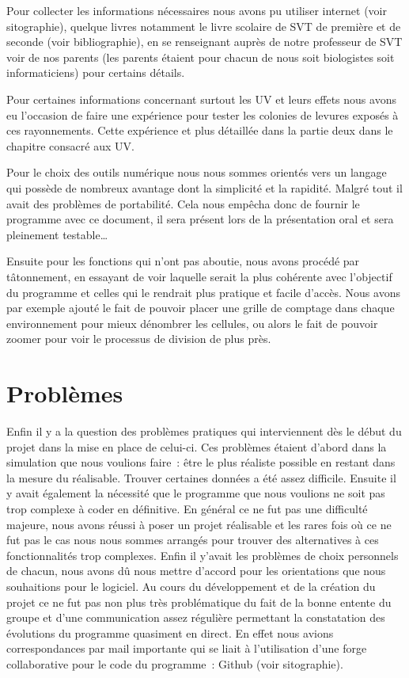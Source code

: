Pour collecter les informations nécessaires nous avons pu utiliser internet (voir sitographie), quelque livres notamment le livre scolaire de SVT de première et de seconde (voir bibliographie), en se renseignant auprès de notre professeur de SVT voir de nos parents (les parents étaient pour chacun de nous soit biologistes soit informaticiens) pour certains détails.

Pour certaines informations concernant surtout les UV et leurs effets nous avons eu l’occasion de faire une expérience pour tester les colonies de levures exposés à ces rayonnements. Cette expérience et plus détaillée dans la partie deux dans le chapitre consacré aux UV.

Pour le choix des outils numérique nous nous sommes orientés vers un langage qui possède de nombreux avantage dont la simplicité et la rapidité. Malgré tout il avait des problèmes de portabilité. Cela nous empêcha donc de fournir le programme avec ce document, il sera présent lors de la présentation oral et sera pleinement testable…

Ensuite pour les fonctions qui n’ont pas aboutie, nous avons procédé par tâtonnement, en essayant de voir laquelle serait la plus cohérente avec l’objectif du programme et celles qui le rendrait plus pratique et facile d’accès. Nous avons par exemple ajouté le fait de pouvoir placer une grille de comptage dans chaque environnement pour mieux dénombrer les cellules, ou alors le fait de pouvoir zoomer pour voir le processus de division de plus près. 

\section{Problèmes}

Enfin il y a la question des problèmes pratiques qui interviennent dès le début du projet dans la mise en place de celui-ci. Ces problèmes étaient d’abord dans la simulation que nous voulions faire : être le plus réaliste possible en restant dans la mesure du réalisable. Trouver certaines données  a été assez difficile. Ensuite il y avait également la nécessité que le programme que nous voulions ne soit pas trop complexe à coder en définitive. En général ce ne fut pas une difficulté majeure, nous avons réussi à poser un projet réalisable et les rares fois où ce ne fut pas le cas nous nous sommes arrangés pour trouver des alternatives à ces fonctionnalités trop complexes. Enfin il y’avait les problèmes de choix personnels de chacun, nous avons dû nous mettre d’accord pour les orientations que nous souhaitions pour le logiciel. Au cours du développement et de la création du projet ce ne fut pas non plus très problématique du fait de la bonne entente du groupe et d’une communication assez régulière permettant la constatation des évolutions du programme quasiment en direct. En effet nous avions correspondances par mail importante qui se liait à l’utilisation d’une forge collaborative pour le code du programme : Github (voir sitographie).

